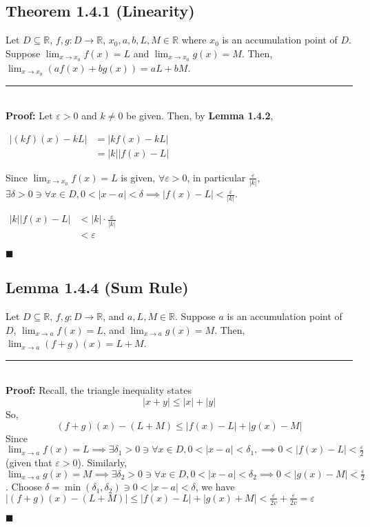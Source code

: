 \documentclass[11pt]{book}
\newcommand{\R}{\mathbb{R}}
\newcommand{\horline}{\noindent\rule{14.25cm}{0.6pt}\\}
\newcommand{\QED}{\begin{flushright}$\blacksquare$\end{flushright}}
\begin{document}
	\subsection{Theorem 1.4.1 (Linearity)}
		\begin{theor}
			Let $D \subseteq \R$, $f,g: D \to \R$, $x_0, a, b, L, M \in \R$ where $x_0$ is an accumulation point of $D$. Suppose
			$\displaystyle\lim_{x \to x_0}{f(x) = L}$ and $\displaystyle\lim_{x \to x_0}{g(x) = M}$. Then,
			$\displaystyle\lim_{x \to x_0}{(af(x) + bg(x)) = aL + bM}$.\\
			\horline
			\textbf{Proof:} Let $\varepsilon > 0$ and $k \neq 0$ be given. Then, by \textbf{Lemma 1.4.2},
			\begin{center}
				\begin{math}
					\begin{aligned}
						|(kf)(x) -kL| & = |kf(x) - kL|\\
						& = |k||f(x) - L|
					\end{aligned}
				\end{math}
			\end{center}
			Since $\displaystyle\lim_{x \to x_0}{f(x) = L}$ is given, $\forall \varepsilon > 0$, in particular $\frac{\varepsilon}{|k|}$,
			$\exists \delta > 0 \ni \forall x \in D, 0 < |x-a| < \delta \implies |f(x) - L| < \frac{\varepsilon}{|k|}$.
			\begin{center}
				\begin{math}
					\begin{aligned}
						|k||f(x) - L| & < |k| \cdot \frac{\varepsilon}{|k|}\\
						& < \varepsilon
					\end{aligned}
				\end{math}
			\end{center}
			\QED
		\end{theor}

	\subsection{Lemma 1.4.4 (Sum Rule)}
		\begin{lemm}
			Let $D \subseteq \R$, $f,g:D \to \R$, and $a,L, M \in \R$. Suppose $a$ is an accumulation point of $D$,
			$\displaystyle\lim_{x \to a}{f(x) = L}$, and $\displaystyle\lim_{x \to a}{g(x) = M}$. Then,
			$\displaystyle\lim_{x \to a}{(f + g)(x) = L + M}$.\\
			\horline
			\textbf{Proof:} Recall, the triangle inequality states $$|x + y| \leq |x| + |y|$$
			So, $$(f+g)(x) - (L+M) \leq |f(x) - L| + |g(x) - M|$$
			Since $\displaystyle\lim_{x \to a}{f(x) = L} \implies \exists \delta_1 > 0 \ni \forall x \in D, 0 < |x -a| <\delta_1,
			\implies 0 < |f(x) - L| < \frac{\varepsilon}{2}$ (given that $\varepsilon > 0$). Similarly, $\displaystyle\lim_{x \to a}{g(x) = M}
			\implies \exists \delta_2 > 0 \ni \forall x \in D, 0 < | x - a| < \delta_2 \implies 0 < | g(x) - M| < \frac{\varepsilon}{2}$. Choose
			$\delta = \min(\delta_1,\delta_2) \ni 0 < |x - a| < \delta$, we have $|(f+g)(x) - (L+M)| \leq |f(x) - L| + |g(x) + M| < \frac{\varepsilon}{2v} +
			\frac{\varepsilon}{2v} = \varepsilon$ \QED

		\end{lemm}
		\newpage
\end{document}
